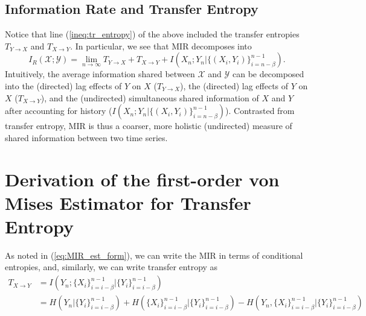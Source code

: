 \documentclass{article} %
\newcommand{\X}{\mathcal{X}}                        %
\newcommand{\Y}{\mathcal{Y}}                        %
\begin{document}
\subsection{Information Rate and Transfer Entropy}
Notice that line (\ref{ineq:tr_entropy}) of the above included the transfer
entropies $T_{Y \to X}$ and $T_{X \to Y}$. In particular, we see that MIR
decomposes into
\[I_R(\X;\Y)
    = \lim_{n \to \infty} T_{Y \to X} + T_{X \to Y}
                    + I(X_n; Y_n | \{(X_i,Y_i)\}_{i = n - \beta}^{n - 1}).\]
Intuitively, the average information shared between $\X$ and $\Y$ can be
decomposed into the (directed) lag effects of $Y$ on $X$ ($T_{Y \to X}$), the
(directed) lag effects of $Y$ on $X$ ($T_{X \to Y}$), and the (undirected)
simultaneous shared information of $X$ and $Y$ after accounting for history
($I(X_n; Y_n | \{(X_i,Y_i)\}_{i = n - \beta}^{n - 1})$). Contrasted from
transfer entropy, MIR is thus a coarser, more holistic (undirected) measure of
shared information between two time series.

\section{Derivation of the first-order von Mises Estimator for Transfer
Entropy}
As noted in (\ref{eq:MIR_est_form}), we can write the MIR in terms of
conditional entropies, and, similarly, we can write transfer entropy as
\begin{align*}
T_{X \to Y}
 &  = I(Y_n; \{X_i\}_{i = i - \beta}^{n - 1}
                                        | \{Y_i\}_{i = i - \beta}^{n - 1}) \\
 &  = H(Y_n | \{Y_i\}_{i = i - \beta}^{n - 1})
    + H(\{X_i\}_{i = i - \beta}^{n - 1} | \{Y_i\}_{i = i - \beta}^{n - 1})
    - H(Y_n,\{X_i\}_{i = i - \beta}^{n - 1} | \{Y_i\}_{i = i - \beta}^{n - 1})
\end{align*}
\end{document}
